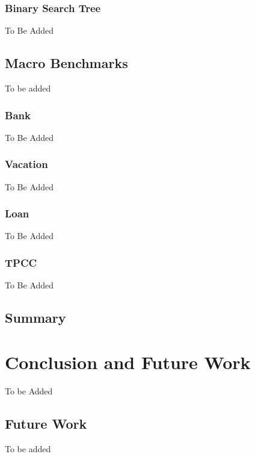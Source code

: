 \documentclass[12pt,english]{report}
\begin{document}
\subsection{Binary Search Tree}

To Be Added 

\section{Macro Benchmarks}

To be added

\subsection{Bank}

To Be Added

\subsection{Vacation}

To Be Added

\subsection{Loan}

To Be Added

\subsection{TPCC}

To Be Added

\section{Summary}


\chapter{Conclusion and Future Work}\label{chap:conclusion}

To be Added

\section{Future Work}

To be added

\newpage
{}



\end{document}

